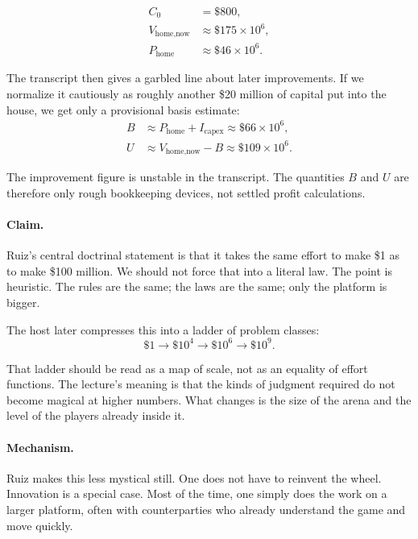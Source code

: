 \begin{align}
C_0 &= \$800,\\
V_{\text{home,now}} &\approx \$175 \times 10^6,\\
P_{\text{home}} &\approx \$46 \times 10^6.
\end{align}

The transcript then gives a garbled line about later improvements. If we normalize it cautiously as roughly another \$20 million of capital put into the house, we get only a provisional basis estimate:
\begin{align}
B &\approx P_{\text{home}} + I_{\text{capex}} \approx \$66 \times 10^6,\\
U &\approx V_{\text{home,now}} - B \approx \$109 \times 10^6.
\end{align}

\begin{remark}
The improvement figure is unstable in the transcript. The quantities \(B\) and \(U\) are therefore only rough bookkeeping devices, not settled profit calculations.
\end{remark}

\paragraph{Claim.}
Ruiz's central doctrinal statement is that it takes the same effort to make \$1 as to make \$100 million. We should not force that into a literal law. The point is heuristic. The rules are the same; the laws are the same; only the platform is bigger.

The host later compresses this into a ladder of problem classes:
\begin{equation}
\$1 \longrightarrow \$10^4 \longrightarrow \$10^6 \longrightarrow \$10^9.
\end{equation}

That ladder should be read as a map of scale, not as an equality of effort functions. The lecture's meaning is that the kinds of judgment required do not become magical at higher numbers. What changes is the size of the arena and the level of the players already inside it.

\paragraph{Mechanism.}
Ruiz makes this less mystical still. One does not have to reinvent the wheel. Innovation is a special case. Most of the time, one simply does the work on a larger platform, often with counterparties who already understand the game and move quickly.

